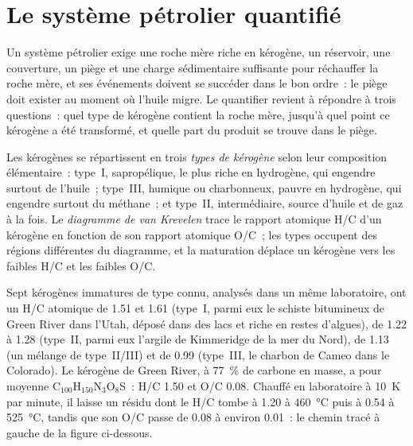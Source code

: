 \section{Le système pétrolier quantifié}\label{sec:b2:energy-geology:petroleum}

Un système pétrolier exige une roche mère riche en kérogène, un réservoir, une couverture, un piège
et une charge sédimentaire suffisante pour réchauffer la roche mère, et ses événements doivent se succéder dans le bon ordre~:
le piège doit exister au moment où l'huile migre. Le quantifier revient à répondre à trois questions~: quel type de kérogène
contient la roche mère, jusqu'à quel point ce kérogène a été transformé, et quelle part du produit
se trouve dans le piège.

\begin{definition}\label{def:b2:energy-geology:kerogen}
Les kérogènes se répartissent en trois \emph{types de kérogène} selon leur composition élémentaire~:
type~I, sapropélique, le plus riche en hydrogène, qui engendre surtout de l'huile~; type~III, humique ou charbonneux,
pauvre en hydrogène, qui engendre surtout du méthane~; et type~II, intermédiaire, source d'huile et de gaz à la fois.
Le \emph{diagramme de van Krevelen} trace le rapport atomique H/C d'un kérogène en fonction de son rapport atomique O/C~;
les types occupent des régions différentes du diagramme, et la maturation
déplace un kérogène vers les faibles H/C et les faibles O/C.
\end{definition}

Sept kérogènes immatures de type connu, analysés dans un même laboratoire, ont un H/C atomique
de 1.51 et 1.61 (type~I, parmi eux le schiste bitumineux de Green River dans l'Utah, déposé dans des lacs et riche en restes d'algues),
de 1.22 à 1.28 (type~II, parmi eux l'argile de Kimmeridge de la mer du Nord), de 1.13 (un mélange de type~II/III) et de 0.99 (type~III, le charbon de Cameo dans le Colorado).
Le kérogène de Green River, à \qty{77}{\percent} de carbone en masse, a pour moyenne C$_{100}$H$_{150}$N$_3$O$_8$S~: H/C 1.50 et
O/C 0.08. Chauffé en laboratoire à \qty{10}{K} par minute, il laisse un résidu dont le H/C tombe à
1.20 à \qty{460}{\celsius} puis à 0.54 à \qty{525}{\celsius},
tandis que son O/C passe de 0.08 à environ
0.01~: le chemin tracé à gauche de la figure ci-dessous.

